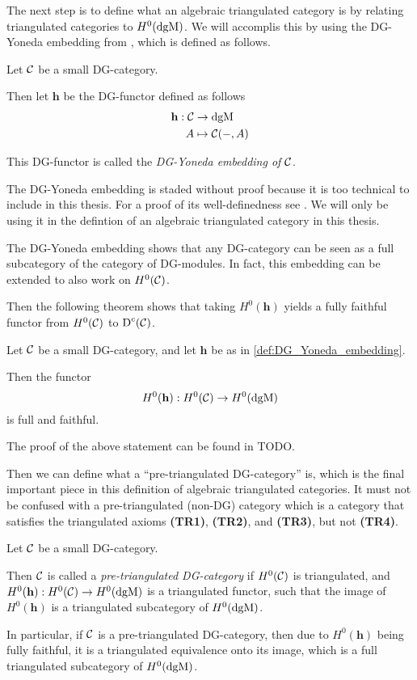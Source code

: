 The next step is to define what an algebraic triangulated category is by relating triangulated categories to \( H^0(\operatorname{dgM}) \). We will accomplis this by using the DG-Yoneda embedding from \cite[Corollary 6.3.6]{Borceux_1994}, which is defined as follows.
\begin{definition}
    \label{def:DG_Yoneda_embedding}
    Let \( {\mathcal{C}} \) be a small DG-category.
    
    Then let \( \mathbf{h} \) be the DG-functor defined as follows
    \begin{align*}
        \mathbf{h}: {\mathcal{C}} &\to \operatorname{dgM} \\
        A &\mapsto {\mathcal{C}}(-, A)
    \end{align*}

    This DG-functor is called the \emph{DG-Yoneda embedding of \( {\mathcal{C}} \)}.
\end{definition}

The DG-Yoneda embedding is staded without proof because it is too technical to include in this thesis. For a proof of its well-definedness see \cite[Corollary 6.3.6]{Borceux_1994}. We will only be using it in the defintion of an algebraic triangulated category in this thesis.

The DG-Yoneda embedding shows that any DG-category can be seen as a full subcategory of the category of DG-modules. In fact, this embedding can be extended to also work on \( H^0({\mathcal{C}}) \).

Then the following theorem shows that taking \( H^0(\mathbf{h}) \) yields a fully faithful functor from \( H^0({\mathcal{C}}) \) to \( \operatorname{D}^c({\mathcal{C}}) \).

\begin{theorem}
    Let \( {\mathcal{C}} \) be a small DG-category, and let \( \mathbf{h} \) be as in \autoref{def:DG_Yoneda_embedding}.

    Then the functor
    \[
        H^0(\mathbf{h}): H^0({\mathcal{C}}) \to H^0(\operatorname{dgM})
    \]
    is full and faithful.
\end{theorem}
The proof of the above statement can be found in TODO.

Then we can define what a ``pre-triangulated DG-category'' is, which is the final important piece in this definition of algebraic triangulated categories. It must not be confused with a pre-triangulated (non-DG) category which is a category that satisfies the triangulated axioms {\bf (TR1)}, {\bf (TR2)}, and {\bf (TR3)}, but not {\bf (TR4)}.
\begin{definition}
    Let \( {\mathcal{C}} \) be a small DG-category.

    Then \( {\mathcal{C}} \) is called a \emph{pre-triangulated DG-category} if \( H^0({\mathcal{C}}) \) is triangulated, and \( H^0(\mathbf{h}): H^0({\mathcal{C}}) \to H^0(\operatorname{dgM}) \) is a triangulated functor, such that the image of \( H^0(\mathbf{h}) \) is a triangulated subcategory of \( H^0(\operatorname{dgM}) \).
\end{definition}
In particular, if \( {\mathcal{C}} \) is a pre-triangulated DG-category, then due to \( H^0(\mathbf{h}) \) being fully faithful, it is a triangulated equivalence onto its image, which is a full triangulated subcategory of \( H^0(\operatorname{dgM}) \).

